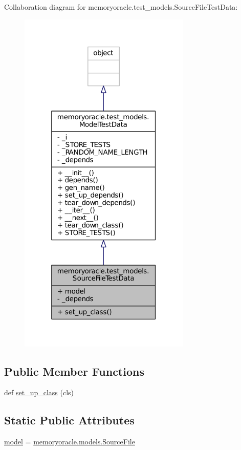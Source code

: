 Collaboration diagram for memoryoracle.\+test\+\_\+models.\+Source\+File\+Test\+Data\+:\nopagebreak
\begin{figure}[H]
\begin{center}
\leavevmode
\includegraphics[width=232pt]{classmemoryoracle_1_1test__models_1_1SourceFileTestData__coll__graph}
\end{center}
\end{figure}
\subsection*{Public Member Functions}
\begin{DoxyCompactItemize}
\item 
def \hyperlink{classmemoryoracle_1_1test__models_1_1SourceFileTestData_a001f4ac50d6251ceb433508e9e165b6f}{set\+\_\+up\+\_\+class} (cls)
\end{DoxyCompactItemize}
\subsection*{Static Public Attributes}
\begin{DoxyCompactItemize}
\item 
\hyperlink{classmemoryoracle_1_1test__models_1_1SourceFileTestData_a32df26215837eee4ca7924b8e87d4107}{model} = \hyperlink{classmemoryoracle_1_1models_1_1SourceFile}{memoryoracle.\+models.\+Source\+File}
\end{DoxyCompactItemize}
